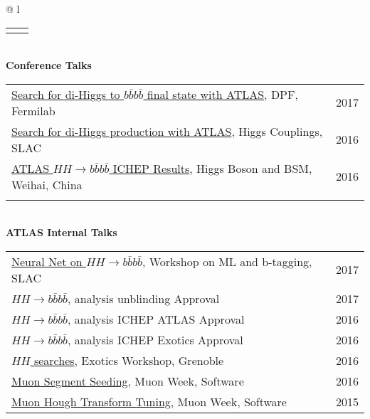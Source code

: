 \documentclass[letterpaper,11pt,oneside]{article}
\newcommand{\blue}[1]{\textcolor[rgb]{0,0,0.9}{#1}}
\begin{document}
\begin{flushleft}
\begin{tabular}{@{} l}
\begin{tabular}{@{} l l }
    
    \hspace{0.8\linewidth} & \hspace{0.1\linewidth} \\
     \end{tabular}
     \\
     \textbf{Conference Talks} \\
     \begin{tabular}{@{} l l }
     \blue{\href{https://indico.fnal.gov/contributionDisplay.py?contribId=70&confId=11999}{Search for di-Higgs to $b\bar{b}b\bar{b}$ final state with ATLAS}}, DPF, Fermilab & 2017\\
     \blue{\href{http://indico.cern.ch/event/477407/contributions/2295628/}{Search for di-Higgs production with ATLAS}}, Higgs Couplings, SLAC & 2016\\
     \blue{\href{http://indico.ihep.ac.cn/event/5635/session/86/contribution/40}{ATLAS $HH\to b\bar{b}b\bar{b}$ ICHEP Results}}, Higgs Boson and BSM, Weihai, China & 2016\\
    \hspace{0.8\linewidth} & \hspace{0.1\linewidth} \\
      \end{tabular}
     \\
     \textbf{ATLAS Internal Talks} \\
     \begin{tabular}{@{} l l }
     \blue{\href{https://indico.cern.ch/event/615994/contributions/2607475}{Neural Net on $HH\to b\bar{b}b\bar{b}$}}, Workshop on ML and b-tagging, SLAC & 2017 \\
     \blue{\href{https://indico.cern.ch/event/628586/contributions/2647498}{$HH\to b\bar{b}b\bar{b}$}}, analysis unblinding Approval & 2017 \\
     \blue{\href{https://indico.cern.ch/event/558982/contributions/2255258}{$HH\to b\bar{b}b\bar{b}$}}, analysis ICHEP ATLAS Approval & 2016\\
     \blue{\href{https://indico.cern.ch/event/556566/contributions/2244051}{$HH\to b\bar{b}b\bar{b}$}}, analysis ICHEP Exotics Approval & 2016\\
     \blue{\href{https://indico.cern.ch/event/465157/contributions/1972449}{$HH$ searches}}, Exotics Workshop, Grenoble & 2016\\
      \blue{\href{https://indico.cern.ch/event/570115/contributions/2305843}{Muon Segment Seeding}}, Muon Week, Software & 2016\\
     \blue{\href{https://indico.cern.ch/event/465396/contributions/1984207}{Muon Hough Transform Tuning}}, Muon Week, Software & 2015\\

\end{tabular}
\end{tabular}
\end{flushleft}
\end{document}
